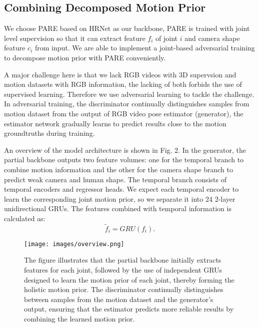\documentclass{svproc}
\begin{document}
\subsection{Combining Decomposed Motion Prior}
We choose PARE based on HRNet \cite{wang2020deep} as our backbone, PARE is trained with joint level supervision so that it can extract feature $f_i$ of joint $i$ and camera shape feature $c_i$ from input. We are able to implement a joint-based adversarial training to decompose motion prior with PARE conveniently.

A major challenge here is that we lack RGB videos with 3D supervsion and motion datasets with RGB information, the lacking of both forbids the use of supervised learning. Therefore we use adversarial learning to tackle the challenge. In adversarial training, the discriminator continually distinguishes samples from motion dataset from the output of RGB video pose estimator (generator), the estimator network gradually learns to predict results close to the motion groundtruths during training.

An overview of the model architecture is shown in Fig. 2. In the generator, the partial backbone outputs two feature volumes: one for the temporal branch to combine motion information and the other for the camera shape branch to predict weak camera and human shape. The temporal branch consists of temporal encoders and regressor heads. We expect each temporal encoder to learn the corresponding joint motion prior, so we separate it into 24 2-layer unidirectional GRUs. The features combined with temporal information is calculated as:
\begin{equation}
    \tilde{f}_i=GRU(f_i) .
\end{equation}

\begin{figure*}[t]
    \centering
    \texttt{[image: images/overview.png]}
    \caption{The figure illustrates that the partial backbone initially extracts features for each joint, followed by the use of independent GRUs designed to learn the motion prior of each joint, thereby forming the holistic motion prior. The discriminator continually distinguishes between samples from the motion dataset and the generator's output, ensuring that the estimator predicts more reliable results by combining the learned motion prior.}
    \label{fig:figure2}
\end{figure*}
\end{document}
